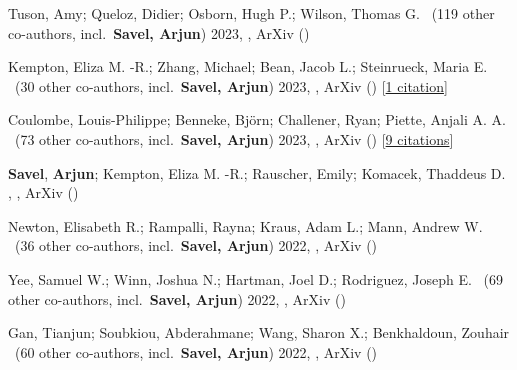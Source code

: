 \item[{\color{numcolor}\scriptsize9}] Tuson, Amy; Queloz, Didier; Osborn, Hugh P.; Wilson, Thomas G. \etal\ ({119} other co-authors, incl.\ \textbf{Savel, Arjun}) 2023, , ArXiv ()

\item[{\color{numcolor}\scriptsize8}] Kempton, Eliza M. -R.; Zhang, Michael; Bean, Jacob L.; Steinrueck, Maria E. \etal\ ({30} other co-authors, incl.\ \textbf{Savel, Arjun}) 2023, , ArXiv () [\href{https://ui.adsabs.harvard.edu/abs/2023arXiv230506240K}{1 citation}]

\item[{\color{numcolor}\scriptsize7}] Coulombe, Louis-Philippe; Benneke, Bj{\"o}rn; Challener, Ryan; Piette, Anjali A. A. \etal\ ({73} other co-authors, incl.\ \textbf{Savel, Arjun}) 2023, , ArXiv () [\href{https://ui.adsabs.harvard.edu/abs/2023arXiv230108192C}{9 citations}]

\item[{\color{numcolor}\scriptsize6}] \textbf{Savel}, \textbf{Arjun}; Kempton, Eliza M. -R.; Rauscher, Emily; Komacek, Thaddeus D. , , ArXiv ()

\item[{\color{numcolor}\scriptsize5}] Newton, Elisabeth R.; Rampalli, Rayna; Kraus, Adam L.; Mann, Andrew W. \etal\ ({36} other co-authors, incl.\ \textbf{Savel, Arjun}) 2022, , ArXiv ()

\item[{\color{numcolor}\scriptsize4}] Yee, Samuel W.; Winn, Joshua N.; Hartman, Joel D.; Rodriguez, Joseph E. \etal\ ({69} other co-authors, incl.\ \textbf{Savel, Arjun}) 2022, , ArXiv ()

\item[{\color{numcolor}\scriptsize3}] Gan, Tianjun; Soubkiou, Abderahmane; Wang, Sharon X.; Benkhaldoun, Zouhair \etal\ ({60} other co-authors, incl.\ \textbf{Savel, Arjun}) 2022, , ArXiv ()

